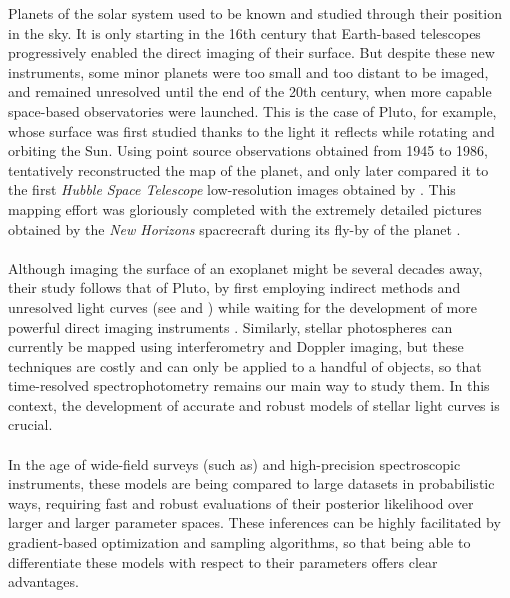 \documentclass[modern]{aastex631}
\begin{document}
Planets of the solar system used to be known and studied through their position in the sky. It is only starting in the 16th century that Earth-based telescopes progressively enabled the direct imaging of their surface. But despite these new instruments, some minor planets were too small and too distant to be imaged, and remained unresolved until the end of the 20th century, when more capable space-based observatories were launched. This is the case of Pluto, for example, whose surface was first studied thanks to the light it reflects while rotating and orbiting the Sun. Using point source observations obtained from 1945 to 1986, \cite{Drish1995} tentatively reconstructed the map of the planet, and only later compared it to the first \textit{Hubble Space Telescope} low-resolution images obtained by \cite{Stern1997}. This mapping effort was gloriously completed with the extremely detailed pictures obtained by the \textit{New Horizons} spacrecraft during its fly-by of the planet \citep{Stern2015}.\\\\
Although imaging the surface of an exoplanet might be several decades away, their study follows that of Pluto, by first employing indirect methods and unresolved light curves (see \citealt{Mayor1995} and \citealt{Charbonneau2000})  while waiting for the development of more powerful direct imaging instruments \cite{}. Similarly, stellar photospheres can currently be mapped using interferometry and Doppler imaging, but these techniques are costly and can only be applied to a handful of objects, so that time-resolved spectrophotometry remains our main way to study them. In this context, the development of accurate and robust models of stellar light curves is crucial.\\\\
In the age of wide-field surveys (such as) and high-precision spectroscopic instruments, these models are being compared to large datasets in probabilistic ways, requiring fast and robust evaluations of their posterior likelihood over larger and larger parameter spaces. These inferences can be highly facilitated by gradient-based optimization and sampling algorithms, so that being able to differentiate these models with respect to their parameters offers clear advantages.\\\\
\end{document}
